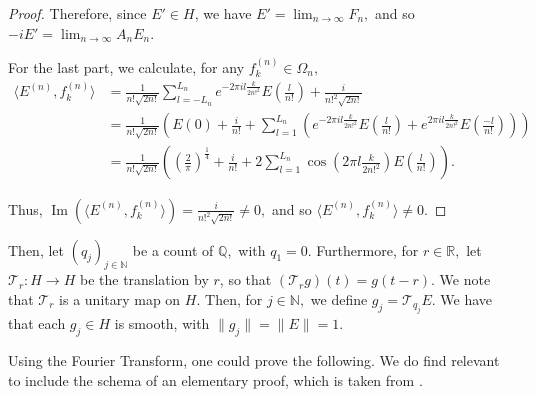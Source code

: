 \documentclass{amsart}
\theoremstyle{definition}
\theoremstyle{remark}
\def \LL{\langle}
\def \RR{\rangle}
\begin{document}
\begin{proof}
	Therefore, since $E'\in H$, we have $E'=\lim_{n\rightarrow\infty} F_n,$ and so $-iE'=\lim_{n\rightarrow\infty}A_n E_n.$
	
	For the last part, we calculate, for any $f_k^{(n)}\in\Omega_n,$
	\begin{align*}
		\LL  E^{(n)}, f_k^{(n)} \RR&=\frac{1}{n!\sqrt{2n!}}\sum_{l=-L_n}^{L_n}e^{-2\pi i l\frac{k}{2n!^2}}E\left(\frac{l}{n!}\right)+\frac{i}{n!^2\sqrt{2n!}}\\
		&=\frac{1}{n!\sqrt{2n!}}\left(E(0)+\frac{i}{n!}+\sum_{l=1}^{L_n}\left(e^{-2\pi i l\frac{k}{2n!^2}}E\left(\frac{l}{n!}\right)+e^{2\pi i l\frac{k}{2n!^2}}E\left(\frac{-l}{n!}\right)\right)\right)\\
		&=\frac{1}{n!\sqrt{2n!}}\left(\left(\frac{2}{\pi}\right)^{\frac{1}{4}}+\frac{i}{n!}+2\sum_{l=1}^{L_n}\cos\left(2\pi l\frac{k}{2n!^2}\right)E\left(\frac{l}{n!}\right)\right).
	\end{align*}
	
	Thus, $\operatorname{Im}(\LL E^{(n)},f_k^{(n)}\RR)=\frac{i}{n!^2\sqrt{2n!}}\neq 0,$ and so $\LL E^{(n)}, f_k^{(n)}\RR\neq 0.$
\end{proof}

Then, let $(q_j)_{j\in\mathbb{N}}$ be a count of $\mathbb{Q},$ with $q_1=0.$ Furthermore, for $r\in\mathbb{R},$ let $\mathcal{T}_r:H\rightarrow H$ be the translation by $r$, so that $(\mathcal{T}_r g)(t)=g(t-r).$ We note that $\mathcal{T}_r$ is a unitary map on $H$. Then, for $j\in\mathbb{N},$ we define $g_j=\mathcal{T}_{q_j} E$. We have that each $g_j\in H$ is smooth, with $\|g_j\|=\|E\|=1.$

Using the Fourier Transform, one could prove the following. We do find relevant to include the schema of an elementary proof, which is taken from \cite{nonez2024spectralequivalencesnonstandardsamplings}.
\end{document}
